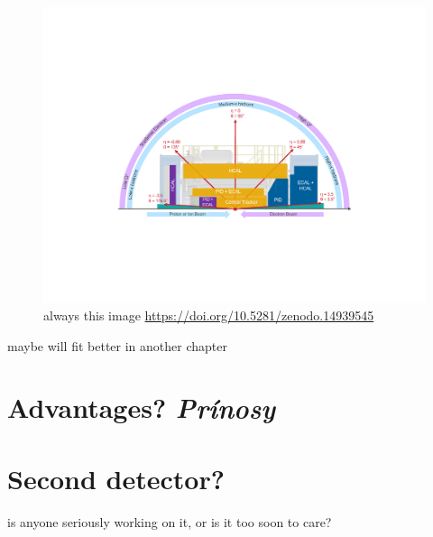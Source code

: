 \begin{figure}[H]
    \centering
    \includegraphics[width=.8\linewidth]{img/range.pdf}
    \caption{always this image \url{https://doi.org/10.5281/zenodo.14939545}}
    \label{fig:eic:range}
\end{figure}
maybe will fit better in another chapter



\section{Advantages? \textit{Prínosy}}

\section{Second detector?}
is anyone seriously working on it, or is it too soon to care?